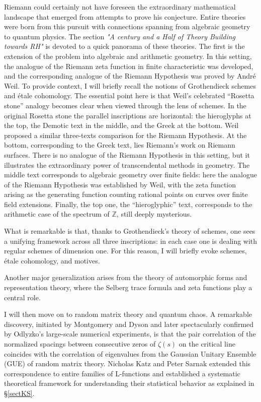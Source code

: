 \documentclass{article}
\begin{document}
   Riemann could certainly not have foreseen the extraordinary mathematical landscape that emerged from attempts to prove his conjecture. Entire theories were born from this pursuit with connections spanning from algebraic geometry to quantum physics. The  section \textit{"A century and a Half of Theory Building towards RH"} is devoted to a quick panorama of these theories.  The first is the extension of the problem into algebraic and arithmetic geometry. In this setting, the analogue of the Riemann zeta function in finite characteristic was developed, and the corresponding analogue of the Riemann Hypothesis was proved by Andr\'e Weil. To provide context, I will briefly recall the notions of Grothendieck schemes and \'etale cohomology. The essential point here is that Weil’s celebrated ``Rosetta stone'' analogy becomes clear when viewed through the lens of schemes. In the original Rosetta stone the parallel inscriptions are horizontal: the hieroglyphs at the top, the Demotic text in the middle, and the Greek at the bottom. Weil proposed a similar three-texts comparison for the Riemann Hypothesis. At the bottom, corresponding to the Greek text, lies Riemann’s work on Riemann surfaces. There is no analogue of the Riemann Hypothesis in this setting, but it illustrates the extraordinary power of transcendental methods in geometry. The middle text  corresponds to algebraic geometry over finite fields: here the analogue of the Riemann Hypothesis was established by Weil, with the zeta function arising as the generating function counting rational points on curves over finite field extensions. Finally, the top one, the ``hieroglyphic'' text, corresponds to the arithmetic case of the spectrum of $\mathbb{Z}$, still deeply mysterious.  

What is remarkable is that, thanks to Grothendieck’s theory of schemes, one sees a unifying framework across all three inscriptions: in each case one is dealing with regular schemes of dimension one. For this reason, I will briefly evoke schemes, \'etale cohomology, and motives.  

Another major generalization arises from the theory of automorphic forms and representation theory, where the Selberg trace formula and zeta functions play a central role. 







I will then move on to random matrix theory and quantum chaos. A remarkable discovery, initiated by Montgomery and Dyson and later spectacularly confirmed by Odlyzko’s large-scale numerical experiments, is that the pair correlation of the normalized spacings between consecutive zeros of $\zeta(s)$ on the critical line coincides with the correlation of eigenvalues from the Gaussian Unitary Ensemble (GUE) of random matrix theory. Nicholas Katz and Peter Sarnak  extended this correspondence to entire families of L-functions and established a systematic theoretical framework for understanding their statistical behavior as explained in \S \ref{sectKS}.
\end{document}
